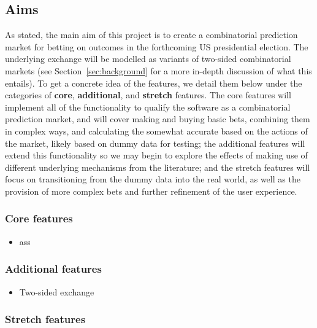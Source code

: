 \documentclass[10pt,a4paper]{article}
\theoremstyle{plain}
\theoremstyle{definition}
\begin{document}
	\subsection{Aims}

	As stated, the main aim of this project is to create a combinatorial
	prediction market for betting on outcomes in the forthcoming US
	presidential election. The underlying exchange will be modelled as variants
	of two-sided combinatorial markets (see Section~\ref{sec:background} for a
	more in-depth discussion of what this entails). To get a concrete idea of
	the features, we detail them below under the categories of \textbf{core},
	\textbf{additional}, and \textbf{stretch} features. The core features will
	implement all of the functionality to qualify the software as a
	combinatorial prediction market, and will cover making and buying basic
	bets, combining them in complex ways, and calculating the somewhat accurate
	based on the actions of the market, likely based on dummy data for testing;
	the additional features will extend this functionality so we may begin to
	explore the effects of making use of different underlying mechanisms from
	the literature; and the stretch features will focus on transitioning from
	the dummy data into the real world, as well as the provision of more
	complex bets and further refinement of the user experience.

	\subsubsection{Core features}

	\begin{itemize}
		\item ass
	\end{itemize}

	\subsubsection{Additional features}

	\begin{itemize}
		\item Two-sided exchange 
	\end{itemize}

	\subsubsection{Stretch features}
\end{document}
